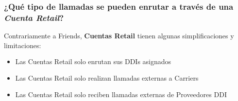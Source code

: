 \documentclass[letterpaper,10pt,spanish]{sphinxmanual}
\begin{document}
\subsubsection{¿Qué tipo de llamadas se pueden enrutar a través de una \emph{Cuenta Retail}?}
\label{administration_portal/client/retail/retail_accounts:what-kind-of-calls-can-be-routed-through-a-retail-account}
Contrariamente a Friends, \textbf{Cuentas Retail} tienen algunas simplificaciones y limitaciones:
\begin{itemize}
\item {} 
Las Cuentas Retail solo enrutan sus DDIs asignados

\item {} 
Las Cuentas Retail solo realizan llamadas externas a Carriers

\item {} 
Las Cuentas Retail solo reciben llamadas externas de Proveedores DDI

\end{itemize}
\end{document}
